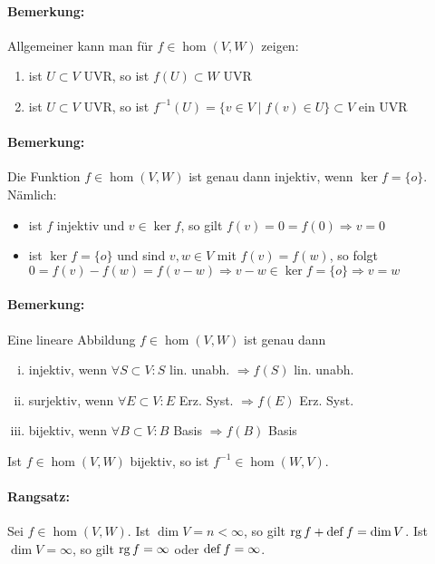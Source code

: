 \paragraph{Bemerkung: }
	Allgemeiner kann man für $f\in \hom (V,W)$ zeigen:
		\begin{enumerate}
			\item ist $U\subset V$ UVR, so ist $f(U)\subset W$ UVR
			\item ist $U\subset V$ UVR, so ist $f^{-1}(U) = \{v\in V\mid f(v) \in U \}\subset V$ ein UVR
		\end{enumerate}

\paragraph{Bemerkung: }
	Die Funktion $f\in \hom (V,W)$ ist genau dann injektiv, wenn $\ker f = \{o\}$. Nämlich:
		\begin{itemize}
			\item ist $f$ injektiv und $v\in \ker f$, so gilt $f(v) = 0 = f(0) \Rightarrow v=0$
			\item ist $\ker f = \{ o \}$ und sind $v,w \in V$ mit $f(v) = f(w)$, so folgt\\
				$0=f(v)-f(w) = f(v-w) \Rightarrow v-w\in \ker f = \{o\} \Rightarrow v = w$
		\end{itemize}

\paragraph{Bemerkung: }
	Eine lineare Abbildung $ f\in \hom (V,W) $ ist genau dann
		\begin{enumerate}[(i)]
			\item injektiv, wenn $ \forall S\subset V: S$ lin. unabh. $ \Rightarrow f(S) $ lin. unabh.
			\item surjektiv, wenn $ \forall E \subset V:E $ Erz. Syst. $ \Rightarrow f(E)$ Erz. Syst.
			\item bijektiv, wenn $ \forall B\subset V: B$ Basis $ \Rightarrow f(B)$ Basis
		\end{enumerate}

	Ist $ f\in \hom (V,W) $ bijektiv, so ist $ f^{-1}\in \hom (W,V) $.

\paragraph{Rangsatz: }
	Sei $ f\in \hom (V,W) $. Ist $ \dim V = n < \infty $,  so gilt $\operatorname{rg} f + \operatorname{def} f = \dim V$.  Ist $ \dim V = \infty $, so gilt $ \operatorname{rg} f = \infty $ oder $ \operatorname{def} f = \infty $.

